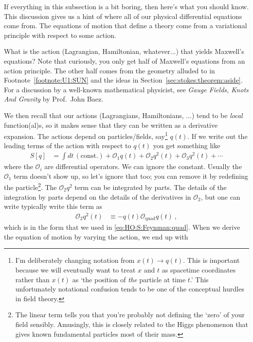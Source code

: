 If everything in this subsection is a bit boring, then here's what you should know. This discussion gives us a hint of where all of our physical differential equations come from. The equations of motion that define a theory come from a variational principle with respect to some action. 
\begin{exercise}
[optional] What is the action (Lagrangian, Hamiltonian, whatever...) that yields Maxwell's equations? Note that curiously, you only get half of Maxwell's equations from an action principle. The other half comes from the geometry alluded to in Footnote~\ref{footnote:U1:SUN} and the ideas in Section~\ref{sec:stokes:theorem:aside}. For a discussion by a well-known  mathematical physicist, see \emph{Gauge Fields, Knots And Gravity} by Prof.~John Baez.
\end{exercise}
We then recall that our actions (Lagrangians, Hamiltonians, ...) tend to be \emph{local} function(al)s, so it makes sense that they can be written as a derivative expansion. The actions depend on particles/fields, say\footnote{I'm deliberately changing notation from $x(t)\to q(t)$. This is important because we will eventually want to treat $x$ and $t$ as spacetime coordinates rather than $x(t)$ as `the position of \emph{the} particle at time $t$.' This unfortunately notational confusion tends to be one of the conceptual hurdles in field theory.} $q(t)$. If we write out the leading terms of the action with respect to $q(t)$ you get something like
\begin{align}
	S[q] &= \int dt \, (\text{const.}) + \mathcal O_1 q(t) + \mathcal O_2 q^2(t) + \mathcal O_3 q^2(t) + \cdots
\end{align}
where the $\mathcal O_i$ are differential operators. We can ignore the constant. Usually the $\mathcal O_1$ term doesn't show up, so let's ignore that too; you can remove it by redefining the particle\footnote{The linear term tells you that you're probably not defining the `zero' of your field sensibly. Amusingly, this is closely related to the Higgs phenomenon that gives known fundamental particles most of their mass.}. The $\mathcal O_2 q^2$ term can be integrated by parts. The details of the integration by parts depend on the details of the derivatives in $\mathcal O_2$, but one can write typically write this term as
\begin{align}
	\mathcal O_2 q^2(t) &\equiv - q(t) \mathcal O_\text{quad} q(t) \ ,
\end{align}
which is in the form that we used in \eqref{eq:HO:S:Feynman:quad}. When we derive the equation of motion by varying the action, we end up with
